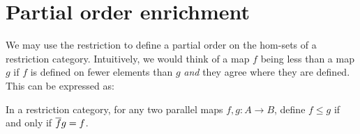 \section{Partial order enrichment} %
\label{sub:enrichment_in_restriction_categories}

We may use the restriction to define a partial order on the hom-sets of a restriction
category. Intuitively, we would think of a map $f$ being less than a map $g$ if $f$ is
defined on fewer elements than $g$ \emph{and} they agree where they are defined. This can be
expressed as:


\begin{definition}\label{def:restriction_category_hom_set_ordering}
  In a restriction category, for any two parallel maps  $f,g:A\to B$, define $f \le g$ if and only if
  $\overline{f} g = f$.
\end{definition}

